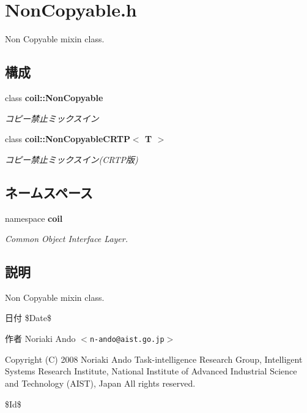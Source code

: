 \section{NonCopyable.h}
\label{NonCopyable_8h}


Non Copyable mixin class.  


\subsection*{構成}
\begin{DoxyCompactItemize}
\item 
class {\bf coil::NonCopyable}
\begin{DoxyCompactList}\small\item\em コピー禁止ミックスイン \item\end{DoxyCompactList}\item 
class {\bf coil::NonCopyableCRTP$<$ T $>$}
\begin{DoxyCompactList}\small\item\em コピー禁止ミックスイン(CRTP版) \item\end{DoxyCompactList}\end{DoxyCompactItemize}
\subsection*{ネームスペース}
\begin{DoxyCompactItemize}
\item 
namespace {\bf coil}


\begin{DoxyCompactList}\small\item\em Common Object Interface Layer. \item\end{DoxyCompactList}

\end{DoxyCompactItemize}


\subsection{説明}
Non Copyable mixin class. \begin{DoxyDate}{日付}
\$Date\$ 
\end{DoxyDate}
\begin{DoxyAuthor}{作者}
Noriaki Ando $<${\tt n-\/ando@aist.go.jp}$>$
\end{DoxyAuthor}
Copyright (C) 2008 Noriaki Ando Task-\/intelligence Research Group, Intelligent Systems Research Institute, National Institute of Advanced Industrial Science and Technology (AIST), Japan All rights reserved.

\$Id\$ 